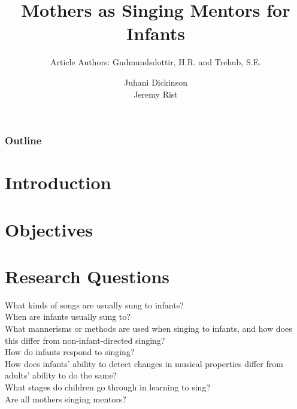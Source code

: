\documentclass{beamer}
\title{Mothers as Singing Mentors for Infants}
\subtitle{Article Authors: Gudmundsdottir, H.R. and Trehub, S.E.}
\author[Juhani Dickinson, Jeremy Rist]{Juhani Dickinson \\ Jeremy Rist}
\begin{document}
\begin{frame}
	\titlepage
\end{frame}

\begin{frame}
	\frametitle{Outline}
	\tableofcontents
\end{frame}

\section{Introduction}
\begin{frame}
\end{frame}

\section{Objectives}
\begin{frame}
\end{frame}

\section{Research Questions}
\begin{frame}
	What kinds of songs are usually sung to infants?\\
	When are infants usually sung to?\\
	What mannerisms or methods are used when singing to infants, and how does this differ from non-infant-directed singing?\\
	How do infants respond to singing?\\
	How does infants' ability to detect changes in musical properties differ from adults' ability to do the same?\\
	What stages do children go through in learning to sing?\\
	Are all mothers singing mentors?
\end{frame}

\end{document}
